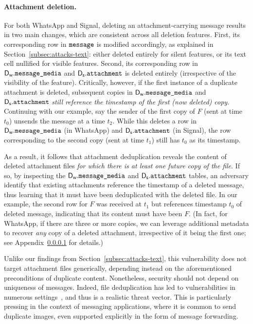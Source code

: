 \paragraph{Attachment deletion.} For both WhatsApp and Signal, deleting an attachment-carrying message results in two main changes, which are consistent across all deletion features. First, its corresponding row in $\texttt{message}$ is modified accordingly, as explained in Section~\ref{subsec:attacks-text}: either deleted entirely for silent features, or its text cell nullified for visible features. Second, its corresponding row in $\textsf{D}_{\textsf{w}}.\texttt{message\_media}$ and $\textsf{D}_{\textsf{s}}.\texttt{attachment}$ is deleted entirely (irrespective of the visibility of the feature). Critically, however, if the first instance of a duplicate attachment is deleted, subsequent copies in $\textsf{D}_{\textsf{w}}.\texttt{message\_media}$ and $\textsf{D}_{\textsf{s}}.\texttt{attachment}$ \emph{still reference the timestamp of the first (now deleted) copy}. Continuing with our example, say the sender of the first copy of $F$ (sent at time $t_0$) unsends the message at a time $t_2$. While this deletes a row in $\textsf{D}_{\textsf{w}}.\texttt{message\_media}$ (in WhatsApp) and $\textsf{D}_{\textsf{s}}.\texttt{attachment}$ (in Signal), the row corresponding to the second copy (sent at time $t_1$) still has $t_0$ as its timestamp.

As a result, it follows that attachment deduplication reveals the content of deleted attachment files \emph{for which there is at least one future copy of the file}. If so, by inspecting the $\textsf{D}_{\textsf{w}}.\texttt{message\_media}$ and $\textsf{D}_{\textsf{s}}.\texttt{attachment}$ tables, an adversary identify that existing attachments reference the timestamp of a deleted message, thus learning that it must have been deduplicated with the deleted file. In our example, the second row for $F$ was received at $t_1$ but references timestamp $t_0$ of deleted message, indicating that its content must have been $F$. (In fact, for WhatsApp, if there are three or more copies, we can leverage additional metadata to recover \emph{any} copy of a deleted attachment, irrespective of it being the first one; 
see Appendix~\ref{} for details.) 

Unlike our findings from Section~\ref{subsec:attacks-text}, this vulnerability does not target attachment files generically, depending instead on the aforementioned preconditions of duplicate content. Nonetheless, security should not depend on uniqueness of messages. Indeed, file deduplication has led to vulnerabilities in numerous settings~\cite{fabrega2024exploiting,truong2025breaking,alexeev2025chunking,ritzdorf2016information,harnik2010side}, and thus is a realistic threat vector. This is particularly pressing in the context of messaging applications, where it is common to send duplicate images, even supported explicitly in the form of message forwarding.


